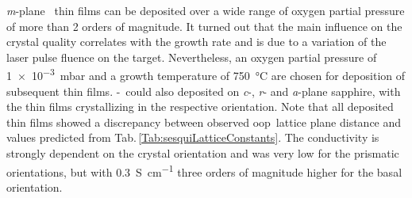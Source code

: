 \textit{m}-plane \cro\ thin films can be deposited over a wide range of oxygen partial pressure of more than 2 orders of magnitude.
It turned out that the main influence on the crystal quality correlates with the growth rate and is due to a variation of the laser pulse fluence on the target.
Nevertheless, an oxygen partial pressure of \qty{1e-3}{\milli\bar} and a growth temperature of \qty{750}{\degreeCelsius} are chosen for deposition of subsequent thin films.
\textalpha-\cro\ could also deposited on \textit{c}-, \textit{r}- and \textit{a}-plane sapphire, with the thin films crystallizing in the respective orientation.
Note that all deposited thin films showed a discrepancy between observed \gls{oop}\ lattice plane distance and values predicted from Tab.\,\ref{Tab:sesquiLatticeConstants}.
The conductivity is strongly dependent on the crystal orientation and was very low for the prismatic orientations, but with \qty{0.3}{\siemens\per\cm} three orders of magnitude higher for the basal orientation.